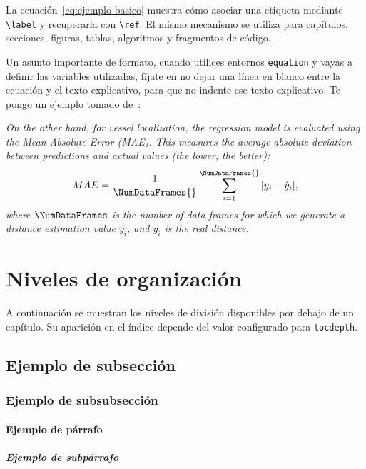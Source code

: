 La ecuación~\ref{eq:ejemplo-basico} muestra cómo asociar una etiqueta mediante \texttt{\textbackslash{}label} y recuperarla con \texttt{\textbackslash{}ref}. El mismo mecanismo se utiliza para capítulos, secciones, figuras, tablas, algoritmos y fragmentos de código.

Un asunto importante de formato, cuando utilices entornos \texttt{equation} y vayas a definir las variables utilizadas, fíjate en no dejar una línea en blanco entre la ecuación y el texto explicativo, para que no indente ese texto explicativo. Te pongo un ejemplo tomado de~\cite{ramirez2026jstars}:

\textit{On the other hand, for vessel localization, the regression model is evaluated using the {Mean Absolute Error (MAE)}. This measures the average absolute deviation between predictions and actual values (the lower, the better):}
\begin{equation}
  MAE = \frac{1}{\NumDataFrames{}} \sum_{i=1}^{\NumDataFrames{}} |y_i - \hat{y}_i|,
\end{equation}
\textit{where $\NumDataFrames$ is the number of data frames for which we generate a distance estimation value $\hat{y}_{i}$, and $y_{i}$ is the real distance.}


\section{Niveles de organización}
\label{sec:niveles-organizacion}

A continuación se muestran los niveles de división disponibles por debajo de un capítulo. Su aparición en el índice depende del valor configurado para \texttt{tocdepth}.


\subsection{Ejemplo de subsección}
\label{sec:subseccion}


\subsubsection{Ejemplo de subsubsección}
\label{sec:subsubseccion}

\paragraph{Ejemplo de párrafo}
\label{sec:paragraph-1}


\subparagraph{Ejemplo de subpárrafo}
\label{sec:subparagraph}

